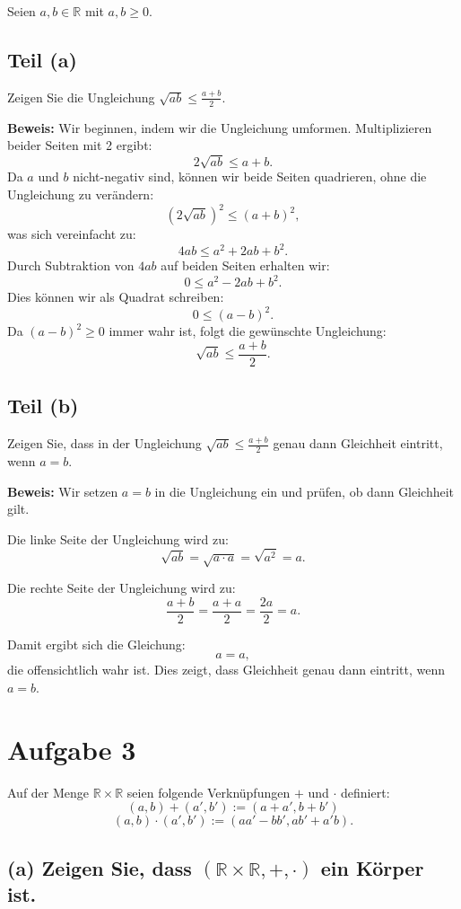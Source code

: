 \documentclass[11pt]{article}
\begin{document}
Seien \( a, b \in \mathbb{R} \) mit \( a, b \geq 0 \).

\subsection*{Teil (a)}
Zeigen Sie die Ungleichung \( \sqrt{ab} \leq \frac{a + b}{2} \).

\textbf{Beweis:} Wir beginnen, indem wir die Ungleichung umformen. Multiplizieren beider Seiten mit 2 ergibt:
\[
2\sqrt{ab} \leq a + b.
\]
Da \( a \) und \( b \) nicht-negativ sind, können wir beide Seiten quadrieren, ohne die Ungleichung zu verändern:
\[
(2\sqrt{ab})^2 \leq (a + b)^2,
\]
was sich vereinfacht zu:
\[
4ab \leq a^2 + 2ab + b^2.
\]
Durch Subtraktion von \( 4ab \) auf beiden Seiten erhalten wir:
\[
0 \leq a^2 - 2ab + b^2.
\]
Dies können wir als Quadrat schreiben:
\[
0 \leq (a - b)^2.
\]
Da \( (a - b)^2 \geq 0 \) immer wahr ist, folgt die gewünschte Ungleichung:
\[
\sqrt{ab} \leq \frac{a + b}{2}.
\]

\subsection*{Teil (b)}
Zeigen Sie, dass in der Ungleichung \( \sqrt{ab} \leq \frac{a + b}{2} \) genau dann Gleichheit eintritt, wenn \( a = b \).

\textbf{Beweis:} Wir setzen \( a = b \) in die Ungleichung ein und prüfen, ob dann Gleichheit gilt.

Die linke Seite der Ungleichung wird zu:
\[
\sqrt{ab} = \sqrt{a \cdot a} = \sqrt{a^2} = a.
\]

Die rechte Seite der Ungleichung wird zu:
\[
\frac{a + b}{2} = \frac{a + a}{2} = \frac{2a}{2} = a.
\]

Damit ergibt sich die Gleichung:
\[
a = a,
\]
die offensichtlich wahr ist. Dies zeigt, dass Gleichheit genau dann eintritt, wenn \( a = b \).

   \section*{Aufgabe 3}

Auf der Menge \( \mathbb{R} \times \mathbb{R} \) seien folgende Verknüpfungen \( + \) und \( \cdot \) definiert:
\[
(a, b) + (a', b') := (a + a', b + b')
\]
\[
(a, b) \cdot (a', b') := (aa' - bb', ab' + a'b).
\]

\subsection*{(a) Zeigen Sie, dass \( (\mathbb{R} \times \mathbb{R}, +, \cdot) \) ein Körper ist.}
\end{document}
